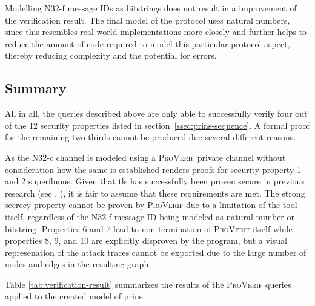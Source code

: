 Modelling N32-f message IDs as bitstrings does not result in a improvement of the verification result.
The final model of the protocol uses natural numbers, since this resembles real-world implementations more closely and further helps to reduce the amount of code required to model this particular protocol aspect, thereby reducing complexity and the potential for errors.

\subsection{Summary}
\label{ssec:verif-summary}

All in all, the queries described above are only able to successfully verify four out of the 12 security properties listed in section~\ref{ssec:prins-sequence}.
A formal proof for the remaining two thirds cannot be produced due several different reasons.

As the N32-c channel is modeled using a \textsc{ProVerif} private channel without consideration how the same is established renders proofs for security property 1 and 2 superfluous.
Given that \gls{tls} has successfully been proven secure in previous research (see \cite{cremers2017comprehensive}, \cite{van2018analysis}), it is fair to assume that these requirements are met.
The strong secrecy property cannot be proven by \textsc{ProVerif} due to a limitation of the tool itself, regardless of the N32-f message ID being modeled as natural number or bitstring.
Properties 6 and 7 lead to non-termination of \textsc{ProVerif} itself while properties 8, 9, and 10 are explicitly disproven by the program, but a visual represenation of the attack traces cannot be exported due to the large number of nodes and edges in the resulting graph.

Table \ref{tab:verification-result} summarizes the results of the \textsc{ProVerif} queries applied to the created model of \gls{prins}.

